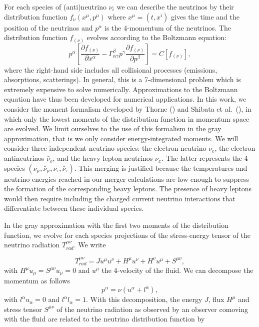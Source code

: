 For each species of (anti)neutrino $\nu_i$ we can describe the neutrinos by their distribution function $f_{\nu}(x^\mu, p^\mu)$ where $x^\mu = (t, x^i)$ gives the time and the position of the neutrinos and $p^\alpha$ is the 4-momentum of the neutrinos. The distribution function $f_{(\nu)}$ evolves according to the Boltzmann equation:
\begin{equation}
  p^\alpha\left[ \frac{\partial f_{(\nu)}}{\partial x^\alpha} - \Gamma^\beta_{\alpha\gamma}p^\gamma\frac{\partial f_{(\nu)}}{\partial p^\beta}\right] = C\left[f_{(\nu)}\right],
\end{equation}
%
where the right-hand side includes all collisional processes (emissions, absorptions, scatterings).
In general, this is a 7-dimensional problem which is extremely expensive to solve numerically. Approximations to the Boltzmann equation have thus been developed for numerical applications. In this work, we consider the moment formalism developed by Thorne (\citet*{1981mnras.194..439t}) and Shibata et al.~(\citet*{shibata:11}), in which only the lowest moments of the distribution function in momentum space are evolved.  We limit ourselves to the use of this formalism in the gray approximation, that is we only consider energy-integrated moments.  We will consider three independent neutrino species: the electron neutrino $\nu_e$, the electron antineutrinos $\bar \nu_e$, and the heavy lepton neutrinos $\nu_x$. The latter represents the 4 species $(\nu_\mu, \bar \nu_\mu, \nu_\tau, \bar \nu_\tau)$. This merging is justified because the temperatures and neutrino energies reached in our merger calculations are low enough to suppress the formation of the corresponding heavy leptons. The presence of heavy leptons would then require including the charged current neutrino interactions that differentiate between these individual species.

In the gray approximation with the first two moments of the distribution function, we evolve for each species projections of the stress-energy tensor of the neutrino radiation $T^{\mu\nu}_{rad}$. We write

\begin{equation}
T^{\mu\nu}_{rad}  = Ju^\mu u^\nu + H^\mu u^\nu + H^\nu u^\mu + S^{\mu\nu},
\end{equation}
%
with $H^\mu u_\mu = S^{\mu\nu}u_\mu = 0$ and $u^\mu$ the 4-velocity of the fluid. We can decompose the momentum as follows
%
\begin{equation}
  p^\alpha = \nu(u^\alpha + l^\alpha),
\end{equation}
%
with $l^\alpha u_\alpha = 0$ and $l^\alpha l_\alpha = 1$. With this decomposition, the energy $J$, flux $H^\mu$ and stress tensor $S^{\mu\nu}$ of the neutrino radiation as observed by an observer comoving with the fluid are related to the neutrino distribution function by

